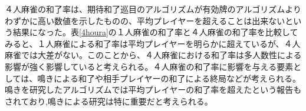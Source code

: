 ４人麻雀の和了率は、期待和了巡目のアルゴリズムが有効牌のアルゴリズムよりわずかに高い数値を示したものの、平均プレイヤーを超えることは出来ないという結果になった。表\ref{4houra}の１人麻雀の和了率と４人麻雀の和了率を比較してみると、１人麻雀による和了率は平均プレイヤーを明らかに超えているが、４人麻雀では大差がない。このことから、４人麻雀における和了率は多人数性による影響が強く影響していると考えられる。４人麻雀の和了率に影響を与える要素としては、鳴きによる和了や相手プレイヤーの和了による終局などが考えられる。鳴きを研究したアルゴリズムでは平均プレイヤーの和了率を超えたという報告もされており\cite{mizukami},鳴きによる研究は特に重要だと考えられる。






